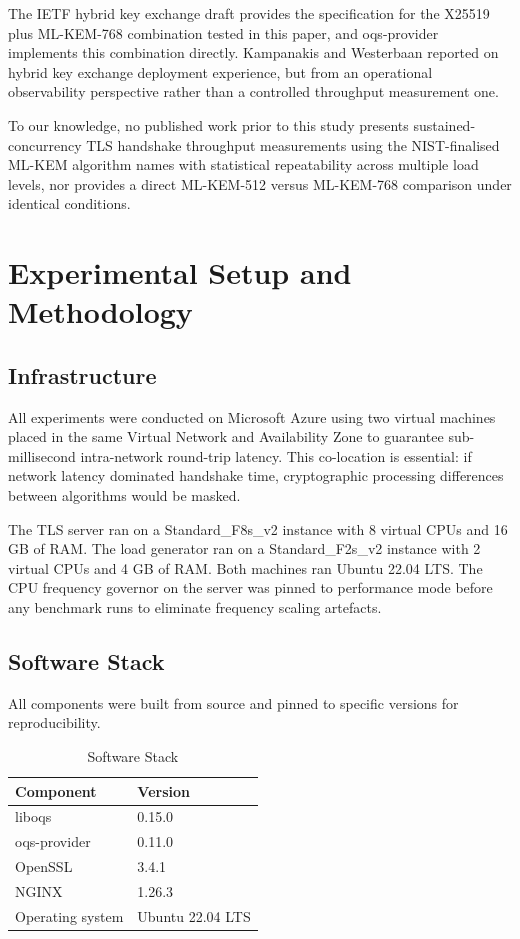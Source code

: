 \documentclass[conference]{IEEEtran}
\begin{document}
The IETF hybrid key exchange draft \cite{b6} provides the specification for the X25519
plus ML-KEM-768 combination tested in this paper, and oqs-provider implements this
combination directly. Kampanakis and Westerbaan \cite{b7} reported on hybrid key
exchange deployment experience, but from an operational observability perspective rather
than a controlled throughput measurement one.

To our knowledge, no published work prior to this study presents sustained-concurrency
TLS handshake throughput measurements using the NIST-finalised ML-KEM algorithm names
with statistical repeatability across multiple load levels, nor provides a direct
ML-KEM-512 versus ML-KEM-768 comparison under identical conditions.

\section{Experimental Setup and Methodology}
\label{sec:setup}

\subsection{Infrastructure}

All experiments were conducted on Microsoft Azure using two virtual machines placed in
the same Virtual Network and Availability Zone to guarantee sub-millisecond
intra-network round-trip latency. This co-location is essential: if network latency
dominated handshake time, cryptographic processing differences between algorithms would
be masked.

The TLS server ran on a Standard\_F8s\_v2 instance with 8 virtual CPUs and 16 GB of
RAM. The load generator ran on a Standard\_F2s\_v2 instance with 2 virtual CPUs and
4 GB of RAM. Both machines ran Ubuntu 22.04 LTS. The CPU frequency governor on the
server was pinned to performance mode before any benchmark runs to eliminate frequency
scaling artefacts.

\subsection{Software Stack}

All components were built from source and pinned to specific versions for reproducibility.

\begin{table}[htbp]
\caption{Software Stack}
\label{tab:stack}
\begin{center}
\begin{tabular}{ll}
\toprule
\textbf{Component} & \textbf{Version} \\
\midrule
liboqs            & 0.15.0 \\
oqs-provider      & 0.11.0 \\
OpenSSL           & 3.4.1  \\
NGINX             & 1.26.3 \\
Operating system  & Ubuntu 22.04 LTS \\
\bottomrule
\end{tabular}
\end{center}
\end{table}
\end{document}
